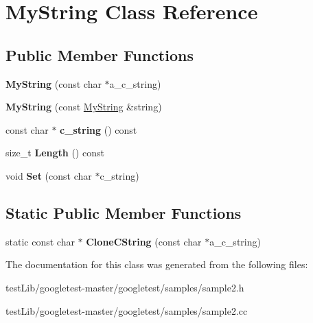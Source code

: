 \hypertarget{classMyString}{}\section{My\+String Class Reference}
\label{classMyString}
\subsection*{Public Member Functions}
\begin{DoxyCompactItemize}
\item 
\mbox{\label{classMyString_a28134eb91b6698f46b12accefa157d0f}} 
{\bfseries My\+String} (const char $\ast$a\+\_\+c\+\_\+string)
\item 
\mbox{\label{classMyString_ae24c7cf89a58dd2287303df2ac054c66}} 
{\bfseries My\+String} (const \hyperlink{classMyString}{My\+String} \&string)
\item 
\mbox{\label{classMyString_aff2af0cf30db39fe24a235670ee6ff25}} 
const char $\ast$ {\bfseries c\+\_\+string} () const
\item 
\mbox{\label{classMyString_a4eb168b1ec401a732b3859abe004d648}} 
size\+\_\+t {\bfseries Length} () const
\item 
\mbox{\label{classMyString_a521c4cd7eccac6ce554d8a51505e4970}} 
void {\bfseries Set} (const char $\ast$c\+\_\+string)
\end{DoxyCompactItemize}
\subsection*{Static Public Member Functions}
\begin{DoxyCompactItemize}
\item 
\mbox{\label{classMyString_a40753dcfa3314a8993f32bdd75d67ce2}} 
static const char $\ast$ {\bfseries Clone\+C\+String} (const char $\ast$a\+\_\+c\+\_\+string)
\end{DoxyCompactItemize}


The documentation for this class was generated from the following files\+:\begin{DoxyCompactItemize}
\item 
test\+Lib/googletest-\/master/googletest/samples/sample2.\+h\item 
test\+Lib/googletest-\/master/googletest/samples/sample2.\+cc\end{DoxyCompactItemize}
